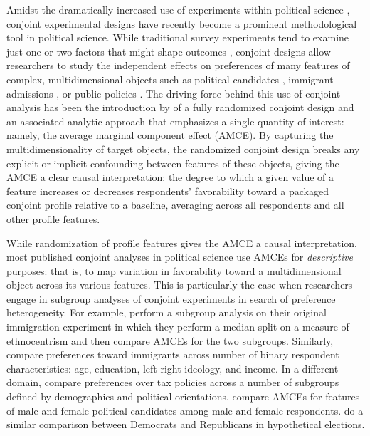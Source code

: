 \documentclass[a4paper,12pt]{article}\usepackage[]{graphicx}\usepackage[]{color}
\begin{document}
Amidst the dramatically increased use of experiments within political science \citep{Druckmanetal2006, Mutz2011}, conjoint experimental designs have recently become a prominent methodological tool in political science. While traditional survey experiments tend to examine just one or two factors that might shape outcomes \citep[see, for reviews,][]{GainesKuklinskiQuirk2007, Sniderman2011}, conjoint designs allow researchers to study the independent effects on preferences of many features of complex, multidimensional objects such as political candidates \citep{Campbelletal2016, TeeleKallaRosenbluth2018}, immigrant admissions \citep{HainmuellerHopkins2015, BansakHainmuellerHangartner2016, WrightLevyCitrin2016}, or public policies \citep{GallegoMarx2017, Hankinson2018}. The driving force behind this use of conjoint analysis has been the introduction by \citet{HainmuellerHopkinsYamamoto2014} of a fully randomized conjoint design and an associated analytic approach that emphasizes a single quantity of interest: namely, the average marginal component effect (AMCE). By capturing the multidimensionality of target objects, the randomized conjoint design breaks any explicit or implicit confounding between features of these objects, giving the AMCE a clear causal interpretation: the degree to which a given value of a feature increases or decreases respondents' favorability toward a packaged conjoint profile relative to a baseline, averaging across all respondents and all other profile features. 

While randomization of profile features gives the AMCE a causal interpretation, most published conjoint analyses in political science use AMCEs for \textit{descriptive} purposes: that is, to map variation in favorability toward a multidimensional object across its various features. This is particularly the case when researchers engage in subgroup analyses of conjoint experiments in search of preference heterogeneity. For example, \citet{HainmuellerHopkinsYamamoto2014} perform a subgroup analysis on their original immigration experiment in which they perform a median split on a measure of ethnocentrism and then compare AMCEs for the two subgroups. Similarly, \citet{BansakHainmuellerHangartner2016} compare preferences toward immigrants across number of binary respondent characteristics: age, education, left-right ideology, and income. In a different domain, \citet{BallardRosaMartinScheve2016} compare preferences over tax policies across a number of subgroups defined by demographics and political orientations. \citet{TeeleKallaRosenbluth2018} compare AMCEs for features of male and female political candidates among male and female respondents. \citet{KirklandCoppock2017} do a similar comparison between Democrats and Republicans in hypothetical elections.
\end{document}
